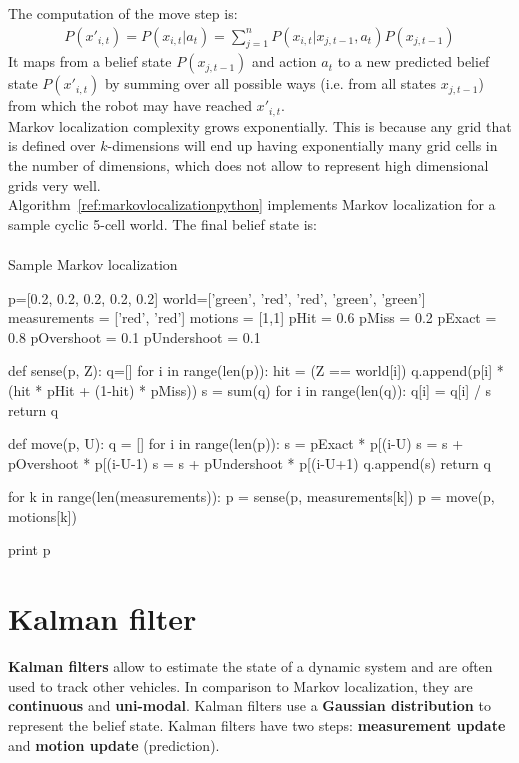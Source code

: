 \documentclass{report}
\begin{document}
The computation of the move step is:
\begin{align*}
P(x'_{i,t}) = P(x_{i,t}\vert a_t) = \sum_{j=1}^{n} P(x_{i,t}\vert x_{j,t-1},a_t)P(x_{j,t-1})
\end{align*}
It maps from a belief state $P(x_{j,t-1})$ and action $a_t$ to a new predicted belief state $P(x'_{i,t})$ by
summing over all possible ways (i.e. from all states $x_{j,t-1}$) from which the robot may have reached $x'_{i,t}$. \\
Markov localization complexity grows exponentially. This is because any grid that is defined over $k$-dimensions will end up having exponentially many grid cells in the number of dimensions, which does not allow to represent high dimensional grids very well. \\
Algorithm~\ref{ref:markovlocalizationpython} implements Markov localization for a sample cyclic 5-cell world. The final belief state is:
\begin{align*}
[0.0789, 0.0753, 0.2247, {\bf 0.4329}, 0.1882]
\end{align*}

\begin{algorithm}
\caption{Sample Markov localization}
\label{ref:markovlocalizationpython}
\begin{python}
p=[0.2, 0.2, 0.2, 0.2, 0.2]
world=['green', 'red', 'red', 'green', 'green']
measurements = ['red', 'red']
motions = [1,1]
pHit = 0.6
pMiss = 0.2
pExact = 0.8
pOvershoot = 0.1
pUndershoot = 0.1

def sense(p, Z):
    q=[]
    for i in range(len(p)):
        hit = (Z == world[i])
        q.append(p[i] * (hit * pHit + (1-hit) * pMiss))
    s = sum(q)
    for i in range(len(q)):
        q[i] = q[i] / s
    return q

def move(p, U):
    q = []
    for i in range(len(p)):
        s = pExact * p[(i-U) %
        s = s + pOvershoot * p[(i-U-1) %
        s = s + pUndershoot * p[(i-U+1) %
        q.append(s)
    return q

for k in range(len(measurements)):
    p = sense(p, measurements[k])
    p = move(p, motions[k])

print p
\end{python}
\end{algorithm}


\section{Kalman filter}
{\bf Kalman filters} allow to estimate the state of a dynamic system and are often used to track other vehicles. In comparison to Markov localization, they are {\bf continuous} and {\bf uni-modal}. Kalman filters use a {\bf Gaussian distribution} to represent the belief state. Kalman filters have two steps: {\bf measurement update} and {\bf motion update} (prediction). \\
\end{document}
